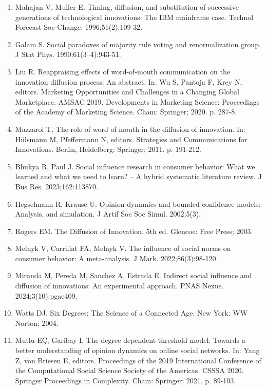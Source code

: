 \documentclass[10pt,letterpaper]{article}
\begin{document}
\begin{enumerate}
\item Mahajan V, Muller E.
Timing, diffusion, and substitution of successive generations of
  technological innovations: The {IBM} mainframe case.
Technol Forecast Soc Change. 1996;51(2):109-32.

\item Galam S.
Social paradoxes of majority rule voting and renormalization group.
J Stat Phys. 1990;61(3--4):943-51.

\item Liu R.
Reappraising effects of word-of-mouth communication on the innovation
  diffusion process: An abstract.
In: Wu S, Pantoja F, Krey N, editors. Marketing Opportunities and
  Challenges in a Changing Global Marketplace. AMSAC 2019. Developments in
  Marketing Science: Proceedings of the Academy of Marketing Science. Cham:
  Springer; 2020. p. 287-8.

\item Mazzarol T.
The role of word of mouth in the diffusion of innovation.
In: H{\"u}lsmann M, Pfeffermann N, editors. Strategies and
  Communications for Innovations. Berlin, Heidelberg: Springer; 2011. p.
  191-212.

\item Bhukya R, Paul J.
Social influence research in consumer behavior: What we learned and
  what we need to learn? -- A hybrid systematic literature review.
J Bus Res. 2023;162:113870.

\item Hegselmann R, Krause U.
Opinion dynamics and bounded confidence models: Analysis, and
  simulation.
J Artif Soc Soc Simul. 2002;5(3).

\item Rogers EM.
The Diffusion of Innovation.
5th ed. Glencoe: Free Press; 2003.

\item Melnyk V, Carrillat FA, Melnyk V.
The influence of social norms on consumer behavior: A meta-analysis.
J Mark. 2022;86(3):98-120.

\item Miranda M, Pereda M, Sanchez A, Estrada E.
Indirect social influence and diffusion of innovations: An
  experimental approach.
PNAS Nexus. 2024;3(10):pgae409.

\item Watts DJ.
Six Degrees: The Science of a Connected Age.
New York: WW Norton; 2004.

\item Mutlu E{\c{C}}, Garibay I.
The degree-dependent threshold model: Towards a better understanding
  of opinion dynamics on online social networks.
In: Yang Z, von Briesen E, editors. Proceedings of the 2019
  International Conference of the Computational Social Science Society of the
  Americas. CSSSA 2020. Springer Proceedings in Complexity. Cham: Springer;
  2021. p. 89-103.


\end{enumerate}
\end{document}
